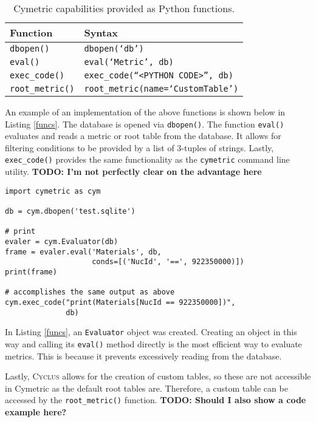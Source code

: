 \documentclass{anstrans}
\newcommand{\cyclus}{\textsc{Cyclus}\xspace}
\newcommand{\TODO}[1] {{\color{red}\textbf{TODO: #1}}}
\newcommand{\code}[1]{{\color{code}\texttt{#1}}}
\begin{document}
\begin{table}[htb]
\centering
\caption{Cymetric capabilities provided as Python functions.}
\begin{tabular}{ll}
\toprule
  Function           & Syntax                 \\
\midrule 
  \code{dbopen()}    & \code{dbopen(`db')}         \\
  \code{eval()}      & \code{eval(`Metric', db)}   \\
  \code{exec\_code()} & \code{exec\_code(``<PYTHON CODE>'', db)}  \\ 
  \code{root\_metric()} & \code{root\_metric(name=`CustomTable')}  \\
\bottomrule
\end{tabular}
\label{tab:pyfunc}
\end{table} 

An example of an implementation of the above functions is shown below in 
Listing \ref{funcs}. The database is opened via \code{dbopen()}. The 
function \code{eval()} evaluates and reads a metric or root table from the 
database. It allows for filtering conditions to be provided by a list of 
3-tuples of strings. 
Lastly, \code{exec\_code()} provides the same functionality as the
\code{cymetric} command line utility. 
\TODO{I'm not perfectly clear on the advantage here}

\begin{lstlisting}[caption ={Example Python Script Using Cymetric}, label=funcs]
import cymetric as cym

db = cym.dbopen('test.sqlite')

# print 
evaler = cym.Evaluator(db)
frame = evaler.eval('Materials', db, 
                    conds=[('NucId', '==', 922350000)])
print(frame)

# accomplishes the same output as above
cym.exec_code("print(Materials[NucId == 922350000])", 
              db)
\end{lstlisting}

In Listing \ref{funcs}, an \code{Evaluator} object was created. 
Creating an object in this way and calling its \code{eval()} method directly 
is the most efficient way to evaluate metrics. This is because
it prevents excessively reading from the database.

Lastly, \cyclus allows for the creation of custom tables, so these are not accessible in Cymetric as the default root tables are. Therefore, a custom table can be accessed by the \code{root\_metric()} function. \TODO{Should I also show a code example here?}
\end{document}
